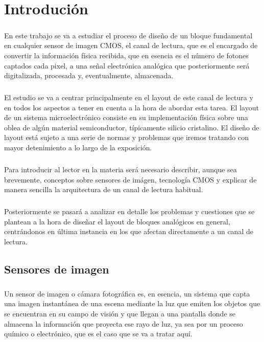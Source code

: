 \chapter{Introdución}

\paragraph{}
En este trabajo se va a estudiar el proceso de diseño de un bloque fundamental
en cualquier sensor de imagen CMOS, el canal de lectura, que es el encargado
de convertir la información física recibida, que en esencia es el número de fotones
captados cada pixel, a una señal electrónica analógica que posteriormente será digitalizada,
procesada y, eventualmente, almacenada.

\paragraph{}
El estudio se va a centrar principalmente en el layout de este canal de
lectura y en todos los aspectos a tener en cuenta a la hora de abordar esta tarea.
El layout de un sistema microelectrónico consiste en su implementación física
sobre una oblea de algún material semiconductor, típicamente silicio cristalino. El
diseño de layout está sujeto a una serie de normas y problemas que iremos tratando
con mayor detenimiento a lo largo de la exposición.

\paragraph{}
Para introducir al lector en la materia será necesario describir, aunque sea
brevemente, conceptos sobre sensores de imágen, tecnología CMOS y explicar de manera
sencilla la arquitectura de un canal de lectura habitual.

\paragraph{}
Posteriormente se pasará a analizar en detalle los problemas y cuestiones que se
plantean a la hora de diseñar el layout de bloques analógicos en general,
centrándonos en última instancia en los que afectan directamente a un canal de lectura.

\section{Sensores de imagen}

\paragraph{}
Un sensor de imagen o cámara fotográfica es, en esencia, un sistema que capta
una imagen instantánea de una escena mediante la luz que emiten los objetos que
se encuentran en su campo de visión y que llegan a una pantalla donde se almacena
la información que proyecta ese rayo de luz, ya sea por un proceso químico
o electrónico, que es el caso que se va a tratar aquí.

